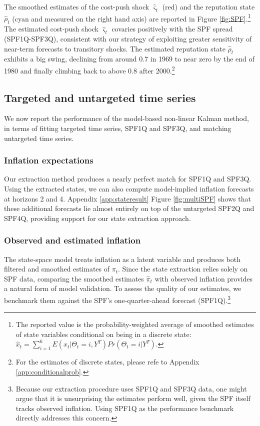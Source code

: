 \documentclass[12pt,letter,leqno]{article}
\theoremstyle{asn}
\theoremstyle{lem}
\theoremstyle{slem}
\theoremstyle{prop}
\theoremstyle{appprop}
\theoremstyle{rem}
\theoremstyle{defn}
\begin{document}
The smoothed estimates of the cost-push shock $\widehat{\varsigma}_t$ (red) and the reputation state $\widehat{\rho}_t$ (cyan and measured on the right hand axis) are reported in Figure \ref{fig:SPF}.\footnote{The reported value is the probability-weighted average of smoothed estimates of state variables conditional on being in a discrete state: $\widehat{x}_t=\sum_{i=1}^6 E(x_t|\Theta_t=i,Y^T)Pr(\Theta_t=i|Y^T)$.}
The estimated cost-push shock $\widehat{\varsigma}_t$ covaries positively with the SPF spread (SPF1Q-SPF3Q), consistent with our strategy of exploiting greater sensitivity of near-term forecasts to transitory shocks. The estimated reputation state $\widehat{\rho}_t$ exhibits a big swing, declining from around 0.7 in 1969 to near zero by the end of 1980 and finally climbing back to above 0.8 after 2000.\footnote{For the estimates of discrete states, please refe to Appendix \ref{app:conditionalprob}.} 

\subsection{Targeted and untargeted time series}
\label{sec:error}

We now report the performance of the model-based non-linear Kalman method, in terms of fitting targeted time series, SPF1Q and SPF3Q, and matching untargeted time series.
\subsubsection{Inflation expectations} 
Our extraction method produces a nearly perfect match for SPF1Q and SPF3Q. Using the extracted states, we can also compute model-implied inflation forecasts at horizons 2 and 4. Appendix \ref{app:stateresult} Figure \ref{fig:multiSPF} shows that these additional forecasts lie almost entirely on top of the untargeted SPF2Q and SPF4Q, providing support for our state extraction approach. 



\subsubsection{Observed and estimated inflation}\label{sec:inflfit}
The state-space model treats inflation as a latent variable and produces both filtered and smoothed estimates of $\pi_t$. Since the state extraction relies solely on SPF data, comparing the smoothed estimates $\widehat{\pi}_t$ with observed inflation provides a natural form of model validation. To assess the quality of our estimates, we benchmark them against the SPF's one-quarter-ahead forecast (SPF1Q).\footnote{Because our extraction procedure uses SPF1Q and SPF3Q data, one might argue that it is unsurprising the estimates perform well, given the SPF itself tracks observed inflation. Using SPF1Q as the performance benchmark directly addresses this concern.}
\end{document}
